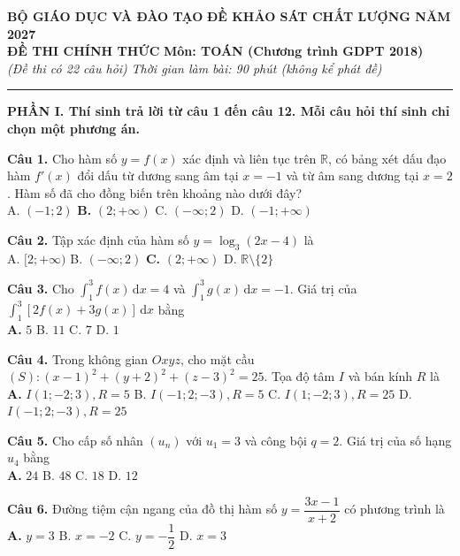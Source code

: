 \documentclass[12pt,a4paper]{article}
\begin{document}
\begin{center}
\textbf{\large BỘ GIÁO DỤC VÀ ĐÀO TẠO} \hfill \textbf{\large ĐỀ KHẢO SÁT CHẤT LƯỢNG NĂM 2027} \\
\textbf{\large ĐỀ THI CHÍNH THỨC} \hfill \textbf{Môn: TOÁN (Chương trình GDPT 2018)} \\
\textit{(Đề thi có 22 câu hỏi)} \hfill \textit{Thời gian làm bài: 90 phút (không kể phát đề)}
\end{center}
\hrule
\vspace{0.4cm}

\textbf{\large PHẦN I. Thí sinh trả lời từ câu 1 đến câu 12. Mỗi câu hỏi thí sinh chỉ chọn một phương án.}

\vspace{0.2cm}
\textbf{Câu 1.} Cho hàm số $y = f(x)$ xác định và liên tục trên $\mathbb{R}$, có bảng xét dấu đạo hàm $f'(x)$ đổi dấu từ dương sang âm tại $x = -1$ và từ âm sang dương tại $x = 2$. Hàm số đã cho đồng biến trên khoảng nào dưới đây? \\
A. $(-1; 2)$ \hfill \textbf{B.} $(2; +\infty)$ \hfill C. $(-\infty; 2)$ \hfill D. $(-1; +\infty)$

\vspace{0.2cm}
\textbf{Câu 2.} Tập xác định của hàm số $y = \log_3(2x - 4)$ là \\
A. $[2; +\infty)$ \hfill B. $(-\infty; 2)$ \hfill \textbf{C.} $(2; +\infty)$ \hfill D. $\mathbb{R} \setminus \{2\}$

\vspace{0.2cm}
\textbf{Câu 3.} Cho $\int_1^3 f(x)\,\mathrm{d}x = 4$ và $\int_1^3 g(x)\,\mathrm{d}x = -1$. Giá trị của $\int_1^3 [2f(x) + 3g(x)]\,\mathrm{d}x$ bằng \\
\textbf{A.} $5$ \hfill B. $11$ \hfill C. $7$ \hfill D. $1$

\vspace{0.2cm}
\textbf{Câu 4.} Trong không gian $Oxyz$, cho mặt cầu $(S): (x - 1)^2 + (y + 2)^2 + (z - 3)^2 = 25$. Tọa độ tâm $I$ và bán kính $R$ là \\
\textbf{A.} $I(1; -2; 3), R = 5$ \hfill B. $I(-1; 2; -3), R = 5$ \hfill C. $I(1; -2; 3), R = 25$ \hfill D. $I(-1; 2; -3), R = 25$

\vspace{0.2cm}
\textbf{Câu 5.} Cho cấp số nhân $(u_n)$ với $u_1 = 3$ và công bội $q = 2$. Giá trị của số hạng $u_4$ bằng \\
\textbf{A.} $24$ \hfill B. $48$ \hfill C. $18$ \hfill D. $12$

\vspace{0.2cm}
\textbf{Câu 6.} Đường tiệm cận ngang của đồ thị hàm số $y = \dfrac{3x - 1}{x + 2}$ có phương trình là \\
\textbf{A.} $y = 3$ \hfill B. $x = -2$ \hfill C. $y = -\dfrac{1}{2}$ \hfill D. $x = 3$
\end{document}
